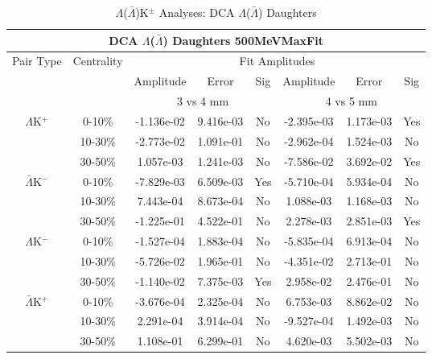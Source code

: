 \documentclass[../AnalysisNoteJBuxton.tex]{subfiles}
\begin{document}
\begin{table}
 \centering
 \begin{tabular}{|c|c|c|c|c||c|c|c|}
  \multicolumn{8}{c}{DCA $\Lambda$($\bar{\Lambda}$) Daughters 500MeVMaxFit} \\
  \hline
  \multirow{3}{*}{Pair Type} & \multirow{3}{*}{Centrality} & \multicolumn{6}{c|}{Fit Amplitudes} \\
  \cline{3-8}
   & & Amplitude & Error & Sig & Amplitude & Error & Sig \\  
  \cline{3-8}
   & & \multicolumn{3}{c||}{3 vs 4 mm} & \multicolumn{3}{c|}{4 vs 5 mm} \\  
  \hline
  \multirow{3}{*}{$\Lambda$K$^{+}$}
   &  0-10\% & -1.136e-02 & 9.416e-03 & No & -2.395e-03 & 1.173e-03 & Yes \\
   & 10-30\% & -2.773e-02 & 1.091e-01 & No & -2.962e-04 & 1.524e-03 & No \\
   & 30-50\% & 1.057e-03 & 1.241e-03 & No & -7.586e-02 & 3.692e-02 & Yes \\
  \hline
  \multirow{3}{*}{$\bar{\Lambda}$K$^{-}$}
   &  0-10\% & -7.829e-03 & 6.509e-03 & Yes & -5.710e-04 & 5.934e-04 & No \\
   & 10-30\% & 7.443e-04 & 8.673e-04 & No & 1.088e-03 & 1.168e-03 & No \\
   & 30-50\% & -1.225e-01 & 4.522e-01 & No & 2.278e-03 & 2.851e-03 & Yes \\
  \hline \hline
  \multirow{3}{*}{$\Lambda$K$^{-}$}
   &  0-10\% & -1.527e-04 & 1.883e-04 & No & -5.835e-04 & 6.913e-04 & No \\
   & 10-30\% & -5.726e-02 & 1.965e-01 & No & -4.351e-02 & 2.713e-01 & No \\
   & 30-50\% & -1.140e-02 & 7.375e-03 & Yes & 2.958e-02 & 2.476e-01 & No \\
  \hline
  \multirow{3}{*}{$\bar{\Lambda}$K$^{+}$}
   &  0-10\% & -3.676e-04 & 2.325e-04 & No & 6.753e-03 & 8.862e-02 & No \\
   & 10-30\% & 2.291e-04 & 3.914e-04 & No & -9.527e-04 & 1.492e-03 & No \\
   & 30-50\% & 1.108e-01 & 6.299e-01 & No & 4.620e-03 & 5.502e-03 & No \\
  \hline
 \end{tabular}
 \caption{$\Lambda$($\bar{\Lambda}$)K$^{\pm}$ Analyses: DCA $\Lambda$($\bar{\Lambda}$) Daughters}
 \label{tab:LamDaughtersDcaLamKch_500MeVMaxFit}
\end{table}
\end{document}
